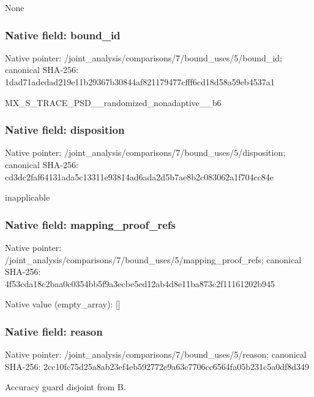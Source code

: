 \documentclass[10pt,a4paper]{article}
\begin{document}
\begingroup\raggedright\sloppy None\par\endgroup

\subsubsection{Native field: bound\_\allowbreak{}id}
Native pointer: /joint\_\allowbreak{}analysis/comparisons/7/bound\_\allowbreak{}uses/5/bound\_\allowbreak{}id; canonical SHA-256: 1dad71adcdad219e11b29367b30844af821179477cfff6cd18d58a59eb4537a1

\begingroup\raggedright\sloppy MX\_\allowbreak{}S\_\allowbreak{}TRACE\_\allowbreak{}PSD\_\allowbreak{}\_\allowbreak{}randomized\_\allowbreak{}nonadaptive\_\allowbreak{}\_\allowbreak{}b6\par\endgroup

\subsubsection{Native field: disposition}
Native pointer: /joint\_\allowbreak{}analysis/comparisons/7/bound\_\allowbreak{}uses/5/disposition; canonical SHA-256: cd3dc2faf64131ada5c13311e93814ad6ada2d5b7ae8b2c083062a1f704cc84e

\begingroup\raggedright\sloppy inapplicable\par\endgroup

\subsubsection{Native field: mapping\_\allowbreak{}proof\_\allowbreak{}refs}
Native pointer: /joint\_\allowbreak{}analysis/comparisons/7/bound\_\allowbreak{}uses/5/mapping\_\allowbreak{}proof\_\allowbreak{}refs; canonical SHA-256: 4f53cda18c2baa0c0354bb5f9a3ecbe5ed12ab4d8e11ba873c2f11161202b945

Native value (empty\_\allowbreak{}array): []

\subsubsection{Native field: reason}
Native pointer: /joint\_\allowbreak{}analysis/comparisons/7/bound\_\allowbreak{}uses/5/reason; canonical SHA-256: 2cc10fc75d25a8ab23ef4eb592772e9a63c7706cc6564fa05b231c5a0df8d349

\begingroup\raggedright\sloppy Accuracy guard disjoint from B.\par\endgroup
\end{document}
